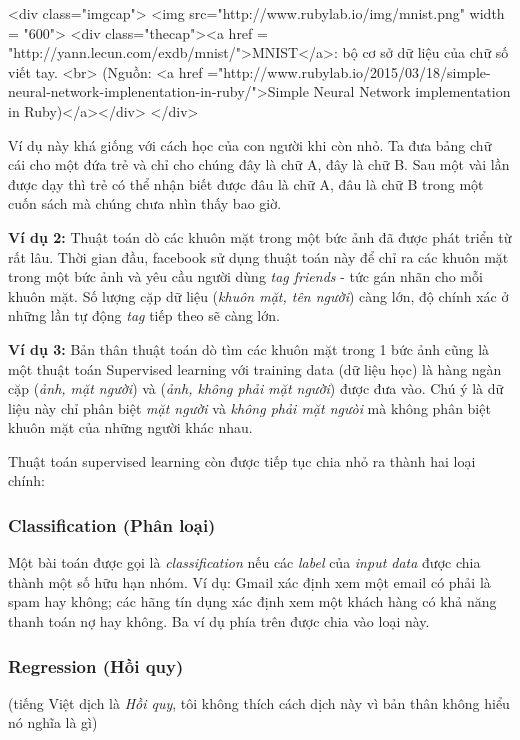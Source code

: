 <div class="imgcap"> 
    <img src="http://www.rubylab.io/img/mnist.png" width = "600"> 
<div class="thecap"><a href = "http://yann.lecun.com/exdb/mnist/">MNIST</a>: bộ cơ sở dữ liệu của chữ số viết tay. <br> (Nguồn: <a href ="http://www.rubylab.io/2015/03/18/simple-neural-network-implenentation-in-ruby/">Simple Neural Network implementation in Ruby)</a></div> 
</div> 
 
 
Ví dụ này khá giống với cách học của con người khi còn nhỏ. Ta đưa bảng chữ cái cho một đứa trẻ và chỉ cho chúng đây là chữ A, đây là chữ B. Sau một vài lần được dạy thì trẻ có thể nhận biết được đâu là chữ A, đâu là chữ B trong một cuốn sách mà chúng chưa nhìn thấy bao giờ.  
 
\textbf{Ví dụ 2:} Thuật toán dò các khuôn mặt trong một bức ảnh đã được phát triển từ rất lâu. Thời gian đầu, facebook sử dụng thuật toán này để chỉ ra các khuôn mặt trong một bức ảnh và yêu cầu người dùng \textit{tag friends} - tức gán nhãn cho mỗi khuôn mặt. Số lượng cặp dữ liệu (\textit{khuôn mặt, tên người}) càng lớn, độ chính xác ở những lần tự động \textit{tag} tiếp theo sẽ càng lớn. 
 
\textbf{Ví dụ 3:} Bản thân thuật toán dò tìm các khuôn mặt trong 1 bức ảnh cũng là một thuật toán Supervised learning với training data (dữ liệu học) là hàng ngàn cặp (\textit{ảnh, mặt người}) và (\textit{ảnh, không phải mặt người}) được đưa vào. Chú ý là dữ liệu này chỉ phân biệt \textit{mặt người} và \textit{không phải mặt ngưòi} mà không phân biệt khuôn mặt của những người khác nhau. 
 
Thuật toán supervised learning còn được tiếp tục chia nhỏ ra thành hai loại chính:  
 
 
\subsubsection{Classification (Phân loại)}
 Một bài toán được gọi là \textit{classification} nếu các \textit{label} của \textit{input data} được chia thành một số hữu hạn nhóm. Ví dụ: Gmail xác định xem một email có phải là spam hay không; các hãng tín dụng xác định xem một khách hàng có khả năng thanh toán nợ hay không. Ba ví dụ phía trên được chia vào loại này.  
 
 
\subsubsection{Regression (Hồi quy)}
(tiếng Việt dịch là \textit{Hồi quy}, tôi không thích cách dịch này vì bản thân không hiểu nó nghĩa là gì) 
 
